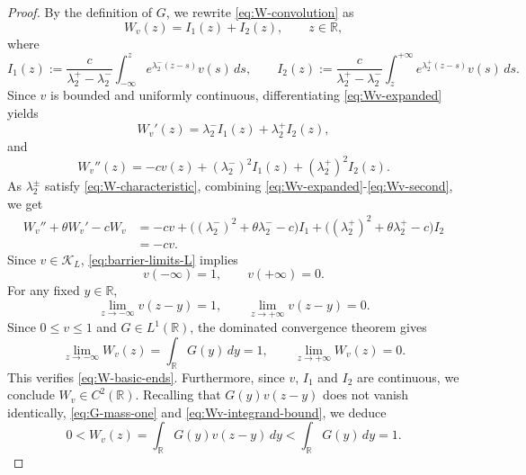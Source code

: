 \documentclass[preprint,sort&compress,final,12pt]{elsarticle}
\numberwithin{equation}{section}
\begin{document}
\begin{proof}
By the definition of $G$, we rewrite \eqref{eq:W-convolution} as
\begin{equation}\label{eq:Wv-expanded}
W_v(z)=I_1(z)+I_2(z),\qquad z\in\mathbb R,
\end{equation}
where
\begin{equation*}
I_1(z):=\frac{c}{\lambda_2^+-\lambda_2^-}\int_{-\infty}^{z}e^{\lambda_2^-(z-s)}v(s)\,ds,\qquad
I_2(z):=\frac{c}{\lambda_2^+-\lambda_2^-}\int_z^{+\infty}e^{\lambda_2^+(z-s)}v(s)\,ds.
\end{equation*}
Since $v$ is bounded and uniformly continuous, differentiating \eqref{eq:Wv-expanded} yields
\begin{equation*}
W_v'(z)=\lambda_2^- I_1(z)+\lambda_2^+ I_2(z),
\end{equation*}
and
\begin{equation}\label{eq:Wv-second}
W_v''(z)=-cv(z)+(\lambda_2^-)^2I_1(z)+(\lambda_2^+)^2I_2(z).
\end{equation}
As $\lambda_2^\pm$ satisfy \eqref{eq:W-characteristic}, combining \eqref{eq:Wv-expanded}-\eqref{eq:Wv-second}, we get
\begin{equation*}
\begin{aligned}
W_v''+\theta W_v'-cW_v&=-cv+\bigl((\lambda_2^-)^2+\theta\lambda_2^- -c\bigr)I_1+\bigl((\lambda_2^+)^2+\theta\lambda_2^+ -c\bigr)I_2\\[0.2cm]
&=-cv.
\end{aligned}
\end{equation*}
Since $v\in\mathcal K_L$, \eqref{eq:barrier-limits-L} implies
\begin{equation*}
v(-\infty)=1,\qquad v(+\infty)=0.
\end{equation*}
For any fixed $y\in\mathbb R$,
\begin{equation*}
\lim_{z\to-\infty}v(z-y)=1,\qquad \lim_{z\to+\infty}v(z-y)=0.
\end{equation*}
Since $0\le v\le1$ and $G\in L^1(\mathbb R)$, the dominated convergence theorem gives
\begin{equation*}
\lim_{z\to-\infty}W_v(z)=\int_{\mathbb R}G(y)\,dy=1,\qquad \lim_{z\to+\infty}W_v(z)=0.
\end{equation*}
This verifies \eqref{eq:W-basic-ends}. Furthermore, since $v$, $I_1$ and $I_2$ are continuous, we conclude $W_v\in C^2(\mathbb R)$. Recalling that $G(y)v(z-y)$ does not vanish identically, \eqref{eq:G-mass-one} and \eqref{eq:Wv-integrand-bound}, we deduce
\begin{equation*}
0<W_v(z)=\int_{\mathbb R}G(y)v(z-y)\,dy<\int_{\mathbb R}G(y)\,dy=1.
\end{equation*}


\end{proof}
\end{document}
